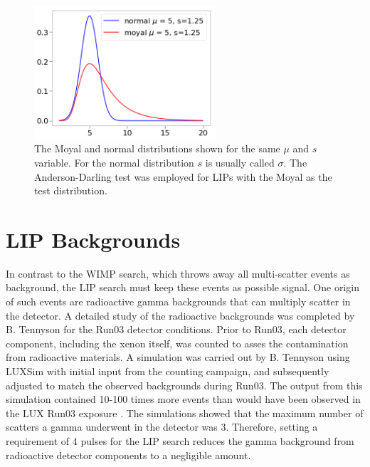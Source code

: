 \begin{figure}[htbp]
\begin{center}
\includegraphics[width=0.6\textwidth]{figures/lips/pdfs.png}
\caption{ The Moyal and normal distributions shown for the same $\mu$ and $s$ variable. For the normal distribution $s$ is usually called $\sigma$. The Anderson-Darling test was employed for \acs{LIP}s with the Moyal as the test distribution.  }
\label{fig:pdfs}
\end{center}
\end{figure}

\FloatBarrier
\section{LIP Backgrounds}
In contrast to the \ac{WIMP} search, which throws away all multi-scatter events as background, the \ac{LIP} search must keep these events as possible signal. One origin of such events are radioactive gamma backgrounds that can multiply scatter in the detector. A detailed study of the radioactive backgrounds was completed by B. Tennyson \cite{Tennyson2017} for the Run03 detector conditions. Prior to Run03, each detector component, including the xenon itself, was counted to asses the contamination from radioactive materials. A simulation was carried out by B. Tennyson using LUXSim with initial input from the counting campaign, and subsequently adjusted to match the observed backgrounds during Run03. The output from this simulation contained 10-100 times more events than would have been observed in the \ac{LUX} Run03 exposure \cite{Tennyson2017}. The simulations showed that the maximum number of scatters a gamma underwent in the detector was 3. Therefore, setting a requirement of 4 pulses for the \ac{LIP} search reduces the gamma background from radioactive detector components to a negligible amount. 

